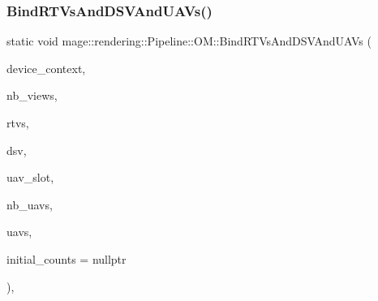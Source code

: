 \mbox{\label{structmage_1_1rendering_1_1_pipeline_1_1_o_m_a7dc275c2961fa64bf20af9d24962ff8f}} 
\subsubsection{\texorpdfstring{Bind\+R\+T\+Vs\+And\+D\+S\+V\+And\+U\+A\+Vs()}{BindRTVsAndDSVAndUAVs()}}
{\footnotesize\ttfamily static void mage\+::rendering\+::\+Pipeline\+::\+O\+M\+::\+Bind\+R\+T\+Vs\+And\+D\+S\+V\+And\+U\+A\+Vs (\begin{DoxyParamCaption}\item[{I\+D3\+D11\+Device\+Context \&}]{device\+\_\+context,  }\item[{\mbox{\hyperlink{namespacemage_a41c104c036fba3756a74e19f793eeaa1}{U32}}}]{nb\+\_\+views,  }\item[{I\+D3\+D11\+Render\+Target\+View $\ast$const $\ast$}]{rtvs,  }\item[{I\+D3\+D11\+Depth\+Stencil\+View $\ast$}]{dsv,  }\item[{\mbox{\hyperlink{namespacemage_a41c104c036fba3756a74e19f793eeaa1}{U32}}}]{uav\+\_\+slot,  }\item[{\mbox{\hyperlink{namespacemage_a41c104c036fba3756a74e19f793eeaa1}{U32}}}]{nb\+\_\+uavs,  }\item[{I\+D3\+D11\+Unordered\+Access\+View $\ast$const $\ast$}]{uavs,  }\item[{const \mbox{\hyperlink{namespacemage_a41c104c036fba3756a74e19f793eeaa1}{U32}} $\ast$}]{initial\+\_\+counts = {\ttfamily nullptr} }\end{DoxyParamCaption})\hspace{0.3cm}{\ttfamily [static]}, {\ttfamily [noexcept]}}

\mbox{\label{structmage_1_1rendering_1_1_pipeline_1_1_o_m_a61d92a091182b3fbfb574588a1a5ffb7}} 
